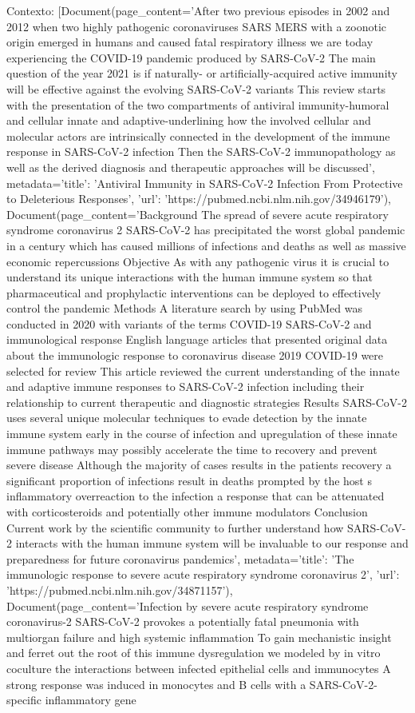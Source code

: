 Contexto: [Document(page\_content='After two previous episodes in 2002 and 2012 when two highly pathogenic coronaviruses SARS MERS with a zoonotic origin emerged in humans and caused fatal respiratory illness we are today experiencing the COVID-19 pandemic produced by SARS-CoV-2 The main question of the year 2021 is if naturally- or artificially-acquired active immunity will be effective against the evolving SARS-CoV-2 variants This review starts with the presentation of the two compartments of antiviral immunity-humoral and cellular innate and adaptive-underlining how the involved cellular and molecular actors are intrinsically connected in the development of the immune response in SARS-CoV-2 infection Then the SARS-CoV-2 immunopathology as well as the derived diagnosis and therapeutic approaches will be discussed', metadata={'title': 'Antiviral Immunity in SARS-CoV-2 Infection From Protective to Deleterious Responses', 'url': 'https://pubmed.ncbi.nlm.nih.gov/34946179'}), Document(page\_content='Background The spread of severe acute respiratory syndrome coronavirus 2 SARS-CoV-2 has precipitated the worst global pandemic in a century which has caused millions of infections and deaths as well as massive economic repercussions Objective As with any pathogenic virus it is crucial to understand its unique interactions with the human immune system so that pharmaceutical and prophylactic interventions can be deployed to effectively control the pandemic Methods A literature search by using PubMed was conducted in 2020 with variants of the terms COVID-19 SARS-CoV-2 and immunological response English language articles that presented original data about the immunologic response to coronavirus disease 2019 COVID-19 were selected for review This article reviewed the current understanding of the innate and adaptive immune responses to SARS-CoV-2 infection including their relationship to current therapeutic and diagnostic strategies Results SARS-CoV-2 uses several unique molecular techniques to evade detection by the innate immune system early in the course of infection and upregulation of these innate immune pathways may possibly accelerate the time to recovery and prevent severe disease Although the majority of cases results in the patients recovery a significant proportion of infections result in deaths prompted by the host s inflammatory overreaction to the infection a response that can be attenuated with corticosteroids and potentially other immune modulators Conclusion Current work by the scientific community to further understand how SARS-CoV-2 interacts with the human immune system will be invaluable to our response and preparedness for future coronavirus pandemics', metadata={'title': 'The immunologic response to severe acute respiratory syndrome coronavirus 2', 'url': 'https://pubmed.ncbi.nlm.nih.gov/34871157'}), Document(page\_content='Infection by severe acute respiratory syndrome coronavirus-2 SARS-CoV-2 provokes a potentially fatal pneumonia with multiorgan failure and high systemic inflammation To gain mechanistic insight and ferret out the root of this immune dysregulation we modeled by in vitro coculture the interactions between infected epithelial cells and immunocytes A strong response was induced in monocytes and B cells with a SARS-CoV-2-specific inflammatory gene 